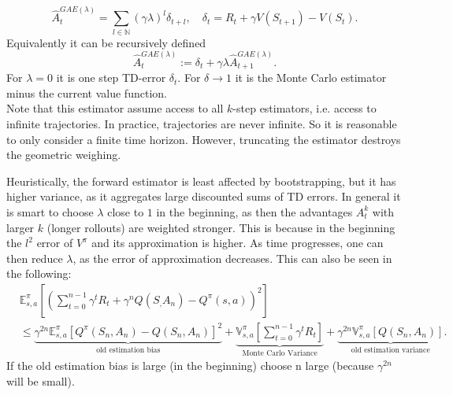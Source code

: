 \documentclass[../main.tex]{subfiles}  %
\begin{document}
{\begin{align*}
    \end{align*}
    \[
    \hat{A}_t^{GAE(\lambda)} = \sum_{l \in \mathbb{N}} (\gamma \lambda)^l \delta_{t+l}, \quad \delta_t = R_t + \gamma V(S_{t+1}) - V(S_t).
    \]
    Equivalently it can be recursively defined 
    \[
    \hat{A}_t^{GAE(\lambda)} := \delta_t + \gamma \lambda \hat{A}_{t+1}^{GAE(\lambda)} .
    \]
    For $\lambda =0$ it is one step TD-error $\delta_t$. For $\delta \to 1$ it is the Monte Carlo estimator minus the current value function.\\
    Note that this estimator assume access to all $k$-step estimators, i.e. access to infinite trajectories. In practice, trajectories are never infinite. So it is reasonable to only consider a finite time horizon. However, truncating the estimator destroys the geometric weighing.
}

Heuristically, the forward estimator is least affected by bootstrapping, but it has higher variance, as it aggregates large discounted sums of TD errors. In general it is smart to choose $\lambda$ close to $1$ in the beginning, as then the advantages $A_t^k$ with larger $k$ (longer rollouts) are weighted stronger. This is because in the beginning the $l^2$ error of $V^\pi$ and its approximation is higher. As time progresses, one can then reduce $\lambda$, as the error of approximation decreases. This can also be seen in the following: 
\begin{align*}
   & \mathbb{E}_{s,a}^\pi \left[ \left( \sum_{t=0}^{n-1} \gamma^t R_t + \gamma^n Q(S_,A_n) - Q^\pi (s,a) \right)^2 \right] \\
    &\leq \underbrace{\gamma^{2n} \mathbb{E}_{s,a}^\pi \left[ Q^\pi (S_n,A_n)-Q(S_n,A_n) \right]^2}_{\text{old estimation bias}} + \underbrace{\mathbb{V}_{s,a}^\pi \left[ \sum_{t=0}^{n-1} \gamma^t R_t \right] }_{\text{Monte Carlo Variance}}+ \underbrace{ \gamma^{2n} \mathbb{V}_{s,a}^\pi [ Q(S_n,A_n)]}_{\text{old estimation variance}}.
\end{align*}
If the old estimation bias is large (in the beginning) choose n large (because $\gamma^{2n}$ will be small).
\end{document}
